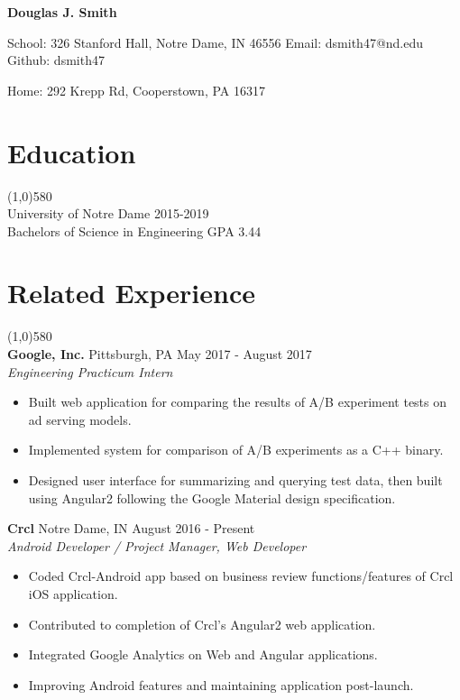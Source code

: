 \documentclass[9pt]{article}
\begin{document}
  \centerline{
    \LARGE\textbf{Douglas J. Smith}
  }
  \centerline{
    School: 326 Stanford Hall, Notre Dame, IN 46556
    Email: dsmith47@nd.edu
    Github: dsmith47
  }
  \centerline{
    Home: 292 Krepp Rd, Cooperstown, PA 16317
  }

  \vspace{-16pt}
  \section*{Education}
    \vspace{-16pt}
    \line(1,0){580}\\
    University of Notre Dame
    \hfill
    2015-2019
    \\
    Bachelors of Science in Engineering
    \hfill
    GPA 3.44
    \\
  \vspace{-28pt}
  \section*{Related Experience}
    \vspace{-16pt}
    \line(1,0){580}\\

    \textbf{Google, Inc.}
    \tab 
    Pittsburgh, PA
    \hfill 
    May 2017 - August 2017
    \\
    \textit{Engineering Practicum Intern}
    \begin{itemize}
      \item Built web application for comparing the results of A/B experiment tests on ad serving models.
      \item Implemented system for comparison of A/B experiments as a C++ binary.
      \item Designed user interface for summarizing and querying test data, then built using Angular2 following the Google Material design specification.
    \end{itemize}
  
    \textbf{Crcl}
    \tab
    Notre Dame, IN
    \hfill
    August 2016 - Present
    \\
    \textit{Android Developer / Project Manager, Web Developer}
    \begin{itemize}
      \item Coded Crcl-Android app based on business review functions/features of Crcl iOS application.
      \item Contributed to completion of Crcl's Angular2 web application.
      \item Integrated Google Analytics on Web and Angular applications.
      \item Improving Android features and maintaining application post-launch.
    \end{itemize}
    
\end{document}
